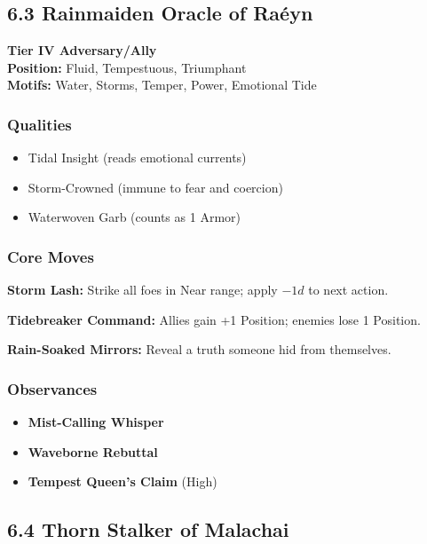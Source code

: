 \documentclass[11pt]{book}
\begin{document}
\subsection{6.3 Rainmaiden Oracle of Raéyn}

\textbf{Tier IV Adversary/Ally} \\
\textbf{Position:} Fluid, Tempestuous, Triumphant \\
\textbf{Motifs:} Water, Storms, Temper, Power, Emotional Tide

\subsubsection*{Qualities}
\begin{itemize}[leftmargin=*]
    \item Tidal Insight (reads emotional currents)
    \item Storm-Crowned (immune to fear and coercion)
    \item Waterwoven Garb (counts as 1 Armor)
\end{itemize}

\subsubsection*{Core Moves}
\textbf{Storm Lash:} Strike all foes in Near range; apply $-1d$ to next action.

\textbf{Tidebreaker Command:} Allies gain +1 Position; enemies lose 1 Position.

\textbf{Rain-Soaked Mirrors:} Reveal a truth someone hid from themselves.

\subsubsection*{Observances}
\begin{itemize}[leftmargin=*]
    \item \textbf{Mist-Calling Whisper}
    \item \textbf{Waveborne Rebuttal}
    \item \textbf{Tempest Queen's Claim} (High)
\end{itemize}

\subsection{6.4 Thorn Stalker of Malachai}
\end{document}

